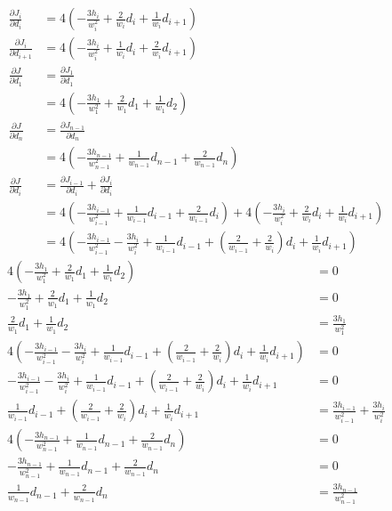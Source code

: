 \documentclass{article}
\begin{document}
\begin{align*}
  \frac{\partial J_i}{\partial d_i}
  &= 4\left(-\frac{3h_i}{w_i^2}+\frac{2}{w_i}d_i+\frac{1}{w_i}d_{i+1}\right) \\
  \frac{\partial J_i}{\partial d_{i+1}}
  &= 4\left(-\frac{3h_i}{w_i^2}+\frac{1}{w_i}d_i+\frac{2}{w_i}d_{i+1}\right) \\
  \frac{\partial J}{\partial d_1}
  &= \frac{\partial J_1}{\partial d_1} \\
  &= 4\left(-\frac{3h_1}{w_1^2}+\frac{2}{w_1}d_1+\frac{1}{w_1}d_2\right) \\
  \frac{\partial J}{\partial d_n}
  &= \frac{\partial J_{n-1}}{\partial d_n} \\
  &= 4\left(-\frac{3h_{n-1}}{w_{n-1}^2}+\frac{1}{w_{n-1}}d_{n-1}+\frac{2}{w_{n-1}}d_n\right) \\
  \frac{\partial J}{\partial d_i}
  &= \frac{\partial J_{i-1}}{\partial d_i}
  + \frac{\partial J_i}{\partial d_i} \\
  &= 4\left(-\frac{3h_{i-1}}{w_{i-1}^2}+\frac{1}{w_{i-1}}d_{i-1}+\frac{2}{w_{i-1}}d_i\right)
  + 4\left(-\frac{3h_i}{w_i^2}+\frac{2}{w_i}d_i+\frac{1}{w_i}d_{i+1}\right) \\
  &= 4\left(-\frac{3h_{i-1}}{w_{i-1}^2}-\frac{3h_i}{w_i^2}
  +\frac{1}{w_{i-1}}d_{i-1}
  +\left(\frac{2}{w_{i-1}}+\frac{2}{w_i}\right)d_i
  +\frac{1}{w_i}d_{i+1}\right)
\end{align*}
\begin{align*}
  4\left(-\frac{3h_1}{w_1^2}+\frac{2}{w_1}d_1+\frac{1}{w_1}d_2\right)
  &= 0 \\
  -\frac{3h_1}{w_1^2}+\frac{2}{w_1}d_1+\frac{1}{w_1}d_2
  &= 0 \\
  \frac{2}{w_1}d_1+\frac{1}{w_1}d_2
  &= \frac{3h_1}{w_1^2} \\
  4\left(-\frac{3h_{i-1}}{w_{i-1}^2}-\frac{3h_i}{w_i^2}
  +\frac{1}{w_{i-1}}d_{i-1}
  +\left(\frac{2}{w_{i-1}}+\frac{2}{w_i}\right)d_i
  +\frac{1}{w_i}d_{i+1}\right)
  &= 0 \\
  -\frac{3h_{i-1}}{w_{i-1}^2}-\frac{3h_i}{w_i^2}
  +\frac{1}{w_{i-1}}d_{i-1}
  +\left(\frac{2}{w_{i-1}}+\frac{2}{w_i}\right)d_i
  +\frac{1}{w_i}d_{i+1}
  &= 0 \\
  \frac{1}{w_{i-1}}d_{i-1}
  +\left(\frac{2}{w_{i-1}}+\frac{2}{w_i}\right)d_i
  +\frac{1}{w_i}d_{i+1}
  &= \frac{3h_{i-1}}{w_{i-1}^2}+\frac{3h_i}{w_i^2} \\
  4\left(-\frac{3h_{n-1}}{w_{n-1}^2}+\frac{1}{w_{n-1}}d_{n-1}+\frac{2}{w_{n-1}}d_n\right)
  &= 0 \\
  -\frac{3h_{n-1}}{w_{n-1}^2}+\frac{1}{w_{n-1}}d_{n-1}+\frac{2}{w_{n-1}}d_n
  &= 0 \\
  \frac{1}{w_{n-1}}d_{n-1}+\frac{2}{w_{n-1}}d_n
  &= \frac{3h_{n-1}}{w_{n-1}^2}
\end{align*}
\end{document}
